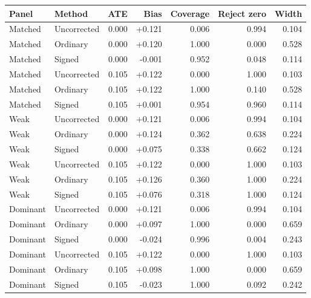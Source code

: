 \begin{center}\small
\begin{tabular}{llrrrrr}\toprule
Panel & Method & ATE & Bias & Coverage & Reject zero & Width \\\midrule
Matched & Uncorrected & 0.000 & +0.121 & 0.006 & 0.994 & 0.104 \\
Matched & Ordinary & 0.000 & +0.120 & 1.000 & 0.000 & 0.528 \\
Matched & Signed & 0.000 & -0.001 & 0.952 & 0.048 & 0.114 \\
Matched & Uncorrected & 0.105 & +0.122 & 0.000 & 1.000 & 0.103 \\
Matched & Ordinary & 0.105 & +0.122 & 1.000 & 0.140 & 0.528 \\
Matched & Signed & 0.105 & +0.001 & 0.954 & 0.960 & 0.114 \\
Weak & Uncorrected & 0.000 & +0.121 & 0.006 & 0.994 & 0.104 \\
Weak & Ordinary & 0.000 & +0.124 & 0.362 & 0.638 & 0.224 \\
Weak & Signed & 0.000 & +0.075 & 0.338 & 0.662 & 0.124 \\
Weak & Uncorrected & 0.105 & +0.122 & 0.000 & 1.000 & 0.103 \\
Weak & Ordinary & 0.105 & +0.126 & 0.360 & 1.000 & 0.224 \\
Weak & Signed & 0.105 & +0.076 & 0.318 & 1.000 & 0.124 \\
Dominant & Uncorrected & 0.000 & +0.121 & 0.006 & 0.994 & 0.104 \\
Dominant & Ordinary & 0.000 & +0.097 & 1.000 & 0.000 & 0.659 \\
Dominant & Signed & 0.000 & -0.024 & 0.996 & 0.004 & 0.243 \\
Dominant & Uncorrected & 0.105 & +0.122 & 0.000 & 1.000 & 0.103 \\
Dominant & Ordinary & 0.105 & +0.098 & 1.000 & 0.000 & 0.659 \\
Dominant & Signed & 0.105 & -0.023 & 1.000 & 0.092 & 0.242 \\
\bottomrule\end{tabular}
\end{center}
